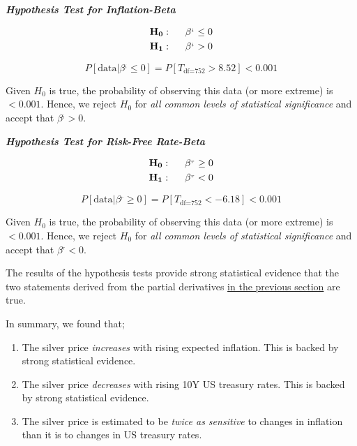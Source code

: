 \documentclass[
  12pt,
]{article}
\providecommand{\tightlist}{%
  \setlength{\itemsep}{0pt}\setlength{\parskip}{0pt}}
\begin{document}
\newpage

\textbf{\emph{Hypothesis Test for Inflation-Beta}}

\begin{align}
\mathbf{H_0}: \hspace{5mm} \beta^{_i} &\leq 0 \notag\\
\mathbf{H_1}: \hspace{5mm} \beta^{_i} &> 0 \notag
\end{align}

\[P[ \textrm{data} | \beta^{_i} \leq 0] = P[T_{\textrm{df=}752} > 8.52] \mathbf{< 0.001}\]

Given \(H_0\) is true, the probability of observing this data (or more
extreme) is \(< 0.001\). Hence, we reject \(H_0\) for \emph{all common
levels of statistical significance} and accept that \(\beta^{_i} > 0\).

\vspace{5 mm}

\textbf{\emph{Hypothesis Test for Risk-Free Rate-Beta}}

\begin{align}
\mathbf{H_0}: \hspace{5mm} \beta^{_r} &\geq 0 \notag\\
\mathbf{H_1}: \hspace{5mm} \beta^{_r} &< 0 \notag
\end{align}

\[P[ \textrm{data} | \beta^{_r} \geq 0] = P[T_{\textrm{df=}752} < -6.18] \mathbf{< 0.001}\]

Given \(H_0\) is true, the probability of observing this data (or more
extreme) is \(< 0.001\). Hence, we reject \(H_0\) for \emph{all common
levels of statistical significance} and accept that \(\beta^{_r} < 0\).

The results of the hypothesis tests provide strong statistical evidence
that the two statements derived from the partial derivatives
\protect\hyperlink{silver-spot-pricing-hypothesis}{in the previous
section} are true.

In summary, we found that;

\begin{enumerate}
\def\labelenumi{\arabic{enumi}.}
\tightlist
\item
  The silver price \emph{increases} with rising expected inflation. This
  is backed by strong statistical evidence.
\item
  The silver price \emph{decreases} with rising 10Y US treasury rates.
  This is backed by strong statistical evidence.
\item
  The silver price is estimated to be \emph{twice as sensitive} to
  changes in inflation than it is to changes in US treasury rates.
\end{enumerate}
\end{document}
